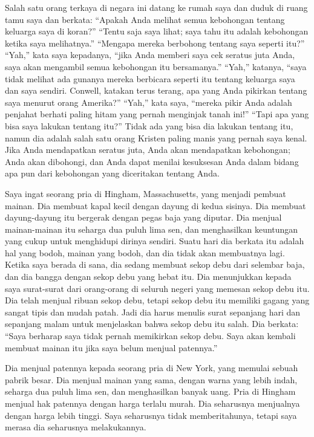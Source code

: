 \documentclass[
  letterpaper,
  DIV=11,
  numbers=noendperiod]{scrreprt}
\begin{document}
Salah satu orang terkaya di negara ini datang ke rumah saya dan duduk di
ruang tamu saya dan berkata: ``Apakah Anda melihat semua kebohongan
tentang keluarga saya di koran?'' ``Tentu saja saya lihat; saya tahu itu
adalah kebohongan ketika saya melihatnya.'' ``Mengapa mereka berbohong
tentang saya seperti itu?'' ``Yah,'' kata saya kepadanya, ``jika Anda
memberi saya cek seratus juta Anda, saya akan mengambil semua kebohongan
itu bersamanya.'' ``Yah,'' katanya, ``saya tidak melihat ada gunanya
mereka berbicara seperti itu tentang keluarga saya dan saya sendiri.
Conwell, katakan terus terang, apa yang Anda pikirkan tentang saya
menurut orang Amerika?'' ``Yah,'' kata saya, ``mereka pikir Anda adalah
penjahat berhati paling hitam yang pernah menginjak tanah ini!'' ``Tapi
apa yang bisa saya lakukan tentang itu?'' Tidak ada yang bisa dia
lakukan tentang itu, namun dia adalah salah satu orang Kristen paling
manis yang pernah saya kenal. Jika Anda mendapatkan seratus juta, Anda
akan mendapatkan kebohongan; Anda akan dibohongi, dan Anda dapat menilai
kesuksesan Anda dalam bidang apa pun dari kebohongan yang diceritakan
tentang Anda.

Saya ingat seorang pria di Hingham, Massachusetts, yang menjadi pembuat
mainan. Dia membuat kapal kecil dengan dayung di kedua sisinya. Dia
membuat dayung-dayung itu bergerak dengan pegas baja yang diputar. Dia
menjual mainan-mainan itu seharga dua puluh lima sen, dan menghasilkan
keuntungan yang cukup untuk menghidupi dirinya sendiri. Suatu hari dia
berkata itu adalah hal yang bodoh, mainan yang bodoh, dan dia tidak akan
membuatnya lagi. Ketika saya berada di sana, dia sedang membuat sekop
debu dari selembar baja, dan dia bangga dengan sekop debu yang hebat
itu. Dia menunjukkan kepada saya surat-surat dari orang-orang di seluruh
negeri yang memesan sekop debu itu. Dia telah menjual ribuan sekop debu,
tetapi sekop debu itu memiliki gagang yang sangat tipis dan mudah patah.
Jadi dia harus menulis surat sepanjang hari dan sepanjang malam untuk
menjelaskan bahwa sekop debu itu salah. Dia berkata: ``Saya berharap
saya tidak pernah memikirkan sekop debu. Saya akan kembali membuat
mainan itu jika saya belum menjual patennya.''

Dia menjual patennya kepada seorang pria di New York, yang memulai
sebuah pabrik besar. Dia menjual mainan yang sama, dengan warna yang
lebih indah, seharga dua puluh lima sen, dan menghasilkan banyak uang.
Pria di Hingham menjual hak patennya dengan harga terlalu murah. Dia
seharusnya menjualnya dengan harga lebih tinggi. Saya seharusnya tidak
memberitahunya, tetapi saya merasa dia seharusnya melakukannya.
\end{document}
